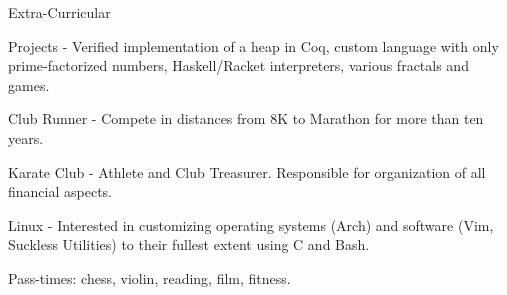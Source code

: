 \documentclass{resume} %
\begin{document}
\begin{rSection}{Extra-Curricular} \itemsep -3pt
	\item Projects - Verified implementation of a heap in Coq, custom language with only prime-factorized numbers, Haskell/Racket interpreters, various fractals and games.
	\item Club Runner - Compete in distances from 8K to Marathon for more than ten years.
	\item Karate Club - Athlete and Club Treasurer. Responsible for organization of all financial aspects.
	\item Linux - Interested in customizing operating systems (Arch) and software (Vim, Suckless Utilities) to their fullest extent using C and Bash.
	\item Pass-times: chess, violin, reading, film, fitness.
\end{rSection}
\end{document}
